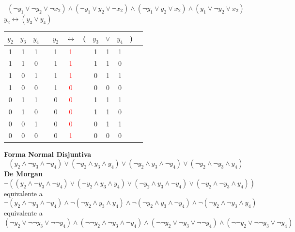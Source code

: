 \documentclass[a4paper]{article}
\begin{document}
\[
    \left(\neg y_{1} \lor \neg y_{2} \lor \neg x_{2}\right) \land \left( \neg y_{1} \lor y_{2} \lor \neg x_{2}\right) \land
    \left(\neg y_{1} \lor y_{2} \lor x_{2}\right) \land \left( y_{1} \lor \neg y_{2} \lor x_{2}\right) %
\]
\newpage
\(y_{2} \longleftrightarrow \left(y_{3} \lor y_{4}\right)\)
\newline
\begin{tabular}{@{ }c@{ }@{ }c@{ }@{ }c | c@{ }@{ }c@{ }@{ }c@{ }@{}c@{}@{ }c@{ }@{ }c@{ }@{ }c@{ }@{}c@{}@{ }c}
    \(y_{2}\) & \(y_{3}\) & \(y_{4}\) &  & \(y_{2}\) & $\leftrightarrow$ & ( & \(y_{3}\) & $\lor$ & \(y_{4}\) & ) & \\
    \hline 
    1 & 1 & 1 &  & 1 & \textcolor{red}{1} &  & 1 & 1 & 1 &  & \\
    1 & 1 & 0 &  & 1 & \textcolor{red}{1} &  & 1 & 1 & 0 &  & \\
    1 & 0 & 1 &  & 1 & \textcolor{red}{1} &  & 0 & 1 & 1 &  & \\
    1 & 0 & 0 &  & 1 & \textcolor{red}{0} &  & 0 & 0 & 0 &  & \\
    0 & 1 & 1 &  & 0 & \textcolor{red}{0} &  & 1 & 1 & 1 &  & \\
    0 & 1 & 0 &  & 0 & \textcolor{red}{0} &  & 1 & 1 & 0 &  & \\
    0 & 0 & 1 &  & 0 & \textcolor{red}{0} &  & 0 & 1 & 1 &  & \\
    0 & 0 & 0 &  & 0 & \textcolor{red}{1} &  & 0 & 0 & 0 &  & \\
\end{tabular}
\newline
\textbf{Forma Normal Disjuntiva}
\[
    \left(y_{2} \land \neg y_{3} \land \neg y_{4}\right) \lor \left(\neg y_{2} \land y_{3} \land y_{4}\right) \lor 
    \left(\neg y_{2} \land y_{3} \land \neg y_{4}\right) \lor \left(\neg y_{2} \land \neg y_{3} \land y_{4} \right)
\]
\textbf{De Morgan}
\[
    \neg \left(\left(y_{2} \land \neg y_{3} \land \neg y_{4}\right) \lor \left(\neg y_{2} \land y_{3} \land y_{4}\right) \lor 
    \left(\neg y_{2} \land y_{3} \land \neg y_{4}\right) \lor \left(\neg y_{2} \land \neg y_{3} \land y_{4} \right)\right)
\]
equivalente a
\[
    \neg \left(y_{2} \land \neg y_{3} \land \neg y_{4}\right) \land \neg \left(\neg y_{2} \land y_{3} \land y_{4}\right) \land
    \neg \left(\neg y_{2} \land y_{3} \land \neg y_{4}\right) \land \neg \left(\neg y_{2} \land \neg y_{3} \land y_{4} \right)
\]
equivalente a
\[
    \left( \neg y_{2} \lor  \neg\neg y_{3} \lor \neg\neg y_{4}\right) \land \left(\neg\neg y_{2} \land \neg y_{3} \land \neg y_{4}\right) \land
    \left(\neg \neg y_{2} \lor  \neg y_{3} \lor  \neg\neg y_{4}\right) \land \left(\neg\neg y_{2} \lor \neg\neg y_{3} \lor \neg y_{4} \right)
\]
\end{document}
